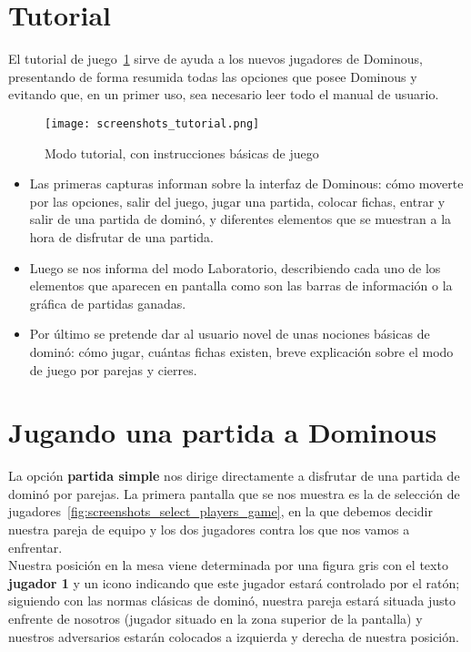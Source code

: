 \section{Tutorial}

El tutorial de juego~\ref{fig:screenshots_tutorial} sirve de ayuda a los nuevos jugadores de Dominous, presentando de forma
resumida todas las opciones que posee Dominous y evitando que, en un primer uso, sea necesario leer todo el manual de usuario.

\begin{figure}[h]
  \label{fig:screenshots_tutorial}
  \begin{center}
    \texttt{[image: screenshots\_tutorial.png]}
  \end{center}
  \caption{Modo tutorial, con instrucciones básicas de juego}
\end{figure}

\begin{itemize}
    \item Las primeras capturas informan sobre la interfaz de Dominous: cómo moverte por las opciones, salir del juego, jugar
        una partida, colocar fichas, entrar y salir de una partida de dominó, y diferentes elementos que se muestran a la
        hora de disfrutar de una partida.
    \item Luego se nos informa del modo Laboratorio, describiendo cada uno de los elementos que aparecen en pantalla como
        son las barras de información o la gráfica de partidas ganadas.
    \item Por último se pretende dar al usuario novel de unas nociones básicas de dominó: cómo jugar, cuántas fichas existen,
        breve explicación sobre el modo de juego por parejas y cierres.
\end{itemize}


\section{Jugando una partida a Dominous}

La opción \textbf{partida simple} nos dirige directamente a disfrutar de una partida de dominó por parejas. La primera
pantalla que se nos muestra es la de selección de jugadores~\ref{fig:screenshots_select_players_game}, en la que debemos
decidir nuestra pareja de equipo y los dos jugadores contra los que nos vamos a enfrentar. \\

Nuestra posición en la mesa viene determinada por una figura gris con el texto \textbf{jugador 1} y un icono indicando
que este jugador estará controlado por el ratón; siguiendo con las normas clásicas de dominó, nuestra pareja estará situada
justo enfrente de nosotros (jugador situado en la zona superior de la pantalla) y nuestros adversarios estarán colocados
a izquierda y derecha de nuestra posición. \\

